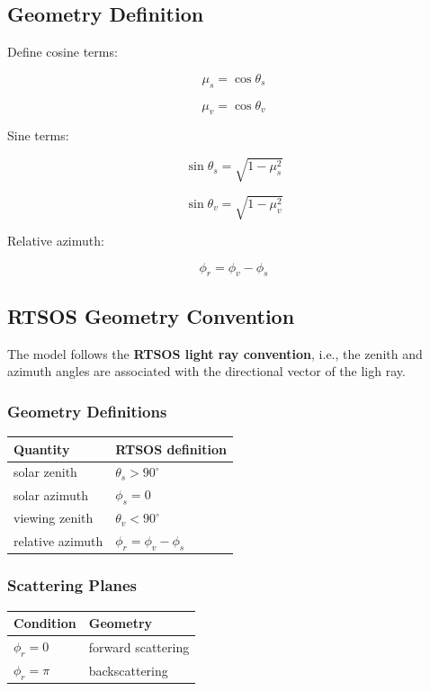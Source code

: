\documentclass[
  letterpaper,
  open=any]{scrbook}
\begin{document}
\subsection{Geometry Definition}\label{geometry-definition}

Define cosine terms:

\[
\mu_s = \cos\theta_s
\]

\[
\mu_v = \cos\theta_v
\]

Sine terms:

\[
\sin\theta_s = \sqrt{1-\mu_s^2}
\]

\[
\sin\theta_v = \sqrt{1-\mu_v^2}
\]

Relative azimuth:

\[
\phi_r = \phi_v - \phi_s
\]

\subsection{RTSOS Geometry Convention}\label{rtsos-geometry-convention}

The model follows the \textbf{RTSOS light ray convention}, i.e., the
zenith and azimuth angles are associated with the directional vector of
the ligh ray.

\subsubsection{Geometry Definitions}\label{geometry-definitions}

\begin{longtable}[]{@{}ll@{}}
\toprule\noalign{}
Quantity & RTSOS definition \\
\midrule\noalign{}
\endhead
\bottomrule\noalign{}
\endlastfoot
solar zenith & \(\theta_s > 90^\circ\) \\
solar azimuth & \(\phi_s = 0\) \\
viewing zenith & \(\theta_v < 90^\circ\) \\
relative azimuth & \(\phi_r = \phi_v - \phi_s\) \\
\end{longtable}

\subsubsection{Scattering Planes}\label{scattering-planes}

\begin{longtable}[]{@{}ll@{}}
\toprule\noalign{}
Condition & Geometry \\
\midrule\noalign{}
\endhead
\bottomrule\noalign{}
\endlastfoot
\(\phi_r = 0\) & forward scattering \\
\(\phi_r = \pi\) & backscattering \\
\end{longtable}
\end{document}
